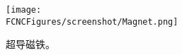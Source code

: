 \begin{figure}[htb]
\centering
\texttt{[image: \\FCNCFigures/screenshot/Magnet.png]}
\caption{超导磁铁。}
\label{fig:Magnet}
\end{figure}